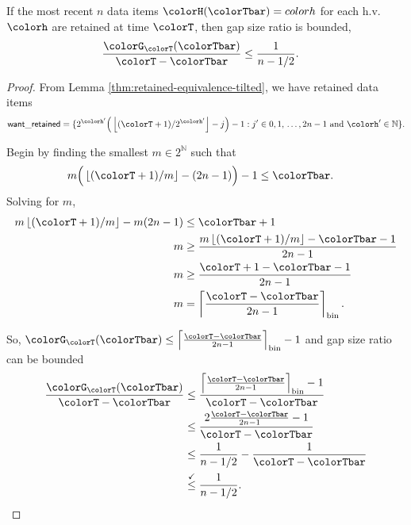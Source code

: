 \begin{lemma}
\label{thm:gap-size-ratio-tilted}
If the most recent $n$ data items $\colorH(\colorTbar) = colorh$ for each h.v. $\colorh$ are retained at time $\colorT$, then gap size ratio is bounded,
\begin{align*}
\frac{\colorG_{\colorT}(\colorTbar)}{\colorT - \colorTbar}
&\leq
\frac{1}{n - 1/2}.
\end{align*}
\end{lemma}
\begin{proof}

From Lemma \ref{thm:retained-equivalence-tilted}, we have retained data items
\begin{align*}
\mathsf{want\_retained} =
\{
2^{\colorh'}\Big(\left\lfloor (\colorT + 1) / 2^{\colorh'} \right\rfloor - j\Big) - 1
  :
  j' \in 0,1,\,\ldots,2n-1
  \text{ and }
  \colorh' \in \mathbb{N}
\}.
\end{align*}

Begin by finding the smallest $m \in 2^{\mathbb{N}}$ such that
\begin{align*}
m\Big( \left\lfloor (\colorT + 1)/m \right\rfloor - (2n - 1)\Big) - 1
&\leq
\colorTbar.
\end{align*}
Solving for $m$,
\begin{align*}
m \left\lfloor (\colorT + 1)/m \right\rfloor - m(2n - 1)
&\leq \colorTbar + 1\\
m
&\geq \frac{
m \left\lfloor (\colorT + 1)/m \right\rfloor - \colorTbar - 1
}{2n - 1}\\
m
&\geq \frac{
\colorT + 1 - \colorTbar - 1
}{2n - 1}\\
m
&= \left\lceil \frac{\colorT - \colorTbar}{2n - 1} \right\rceil_{\mathrm{bin}}.
\end{align*}

So, $\colorG_{\colorT}(\colorTbar) \leq \left\lceil \frac{\colorT - \colorTbar}{2n - 1} \right\rceil_{\mathrm{bin}} - 1$ and gap size ratio can be bounded
\begin{align*}
\frac{\colorG_{\colorT}(\colorTbar)}{\colorT - \colorTbar}
&\leq
\frac{
\left\lceil \frac{\colorT - \colorTbar}{2n - 1} \right\rceil_{\mathrm{bin}} - 1
}{
\colorT - \colorTbar
}\\
&\leq
\frac{
2\frac{\colorT - \colorTbar}{2n - 1}
 - 1
}{
\colorT - \colorTbar
}\\
&\leq
\frac{1
}{n - 1/2}
-
\frac{1
}{
\colorT - \colorTbar
}\\
&\stackrel{\checkmark}{\leq}
\frac{1}{n - 1/2}.
\end{align*}

\end{proof}
